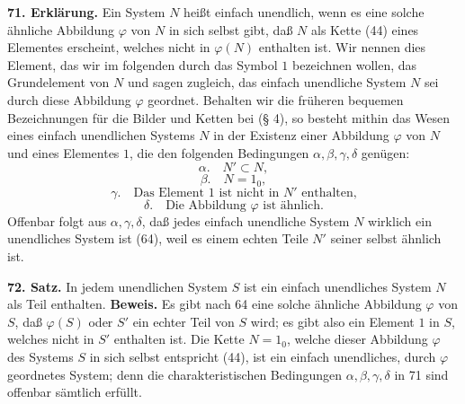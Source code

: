 \documentclass[11pt]{article}
\newcommand{\partof}{\mathrel{\subset}}
\begin{document}
\noindent\textbf{71. Erklärung.} Ein System $N$ heißt einfach unendlich, wenn es eine solche ähnliche Abbildung $\varphi$ von $N$ in sich selbst gibt, daß $N$ als Kette (44) eines Elementes erscheint, welches nicht in $\varphi(N)$ enthalten ist. Wir nennen dies Element, das wir im folgenden durch das Symbol $1$ bezeichnen wollen, das Grundelement von $N$ und sagen zugleich, das einfach unendliche System $N$ sei durch diese Abbildung $\varphi$ geordnet. Behalten wir die früheren bequemen Bezeichnungen für die Bilder und Ketten bei (§ 4), so besteht mithin das Wesen eines einfach unendlichen Systems $N$ in der Existenz einer Abbildung $\varphi$ von $N$ und eines Elementes $1$, die den folgenden Bedingungen $\alpha,\beta,\gamma,\delta$ genügen:
\[
\alpha.\quad N'\partof N,
\]
\[
\beta.\quad N=1_0,
\]
\[
\gamma.\quad \text{Das Element } 1 \text{ ist nicht in } N' \text{ enthalten,}
\]
\[
\delta.\quad \text{Die Abbildung } \varphi \text{ ist ähnlich.}
\]
Offenbar folgt aus $\alpha,\gamma,\delta$, daß jedes einfach unendliche System $N$ wirklich ein unendliches System ist (64), weil es einem echten Teile $N'$ seiner selbst ähnlich ist.

\noindent\textbf{72. Satz.} In jedem unendlichen System $S$ ist ein einfach unendliches System $N$ als Teil enthalten. \textbf{Beweis.} Es gibt nach 64 eine solche ähnliche Abbildung $\varphi$ von $S$, daß $\varphi(S)$ oder $S'$ ein echter Teil von $S$ wird; es gibt also ein Element $1$ in $S$, welches nicht in $S'$ enthalten ist. Die Kette $N=1_0$, welche dieser Abbildung $\varphi$ des Systems $S$ in sich selbst entspricht (44), ist ein einfach unendliches, durch $\varphi$ geordnetes System; denn die charakteristischen Bedingungen $\alpha,\beta,\gamma,\delta$ in 71 sind offenbar sämtlich erfüllt.
\end{document}
